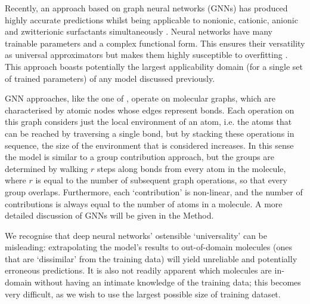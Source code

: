 Recently, an approach based on graph neural networks (GNNs) has produced highly
accurate predictions whilst being applicable to nonionic, cationic, anionic and
zwitterionic surfactants simultaneously \cite{qinPredictingCriticalMicelle2021}.
Neural networks have many trainable parameters and a complex functional form.
This ensures their versatility as universal approximators but makes them highly
susceptible to overfitting \cite{bejaniSystematicReviewOverfitting2021}. This
approach boasts potentially the largest applicability domain (for a single set
of trained parameters) of any model discussed previously.

GNN approaches, like the one of \citet{qinPredictingCriticalMicelle2021},
operate on molecular graphs, which are characterised by atomic nodes whose edges
represent bonds. Each operation on this graph considers just the local
environment of an atom, i.e. the atoms that can be reached by traversing a
single bond, but by stacking these operations in sequence, the size of the
environment that is considered increases. In this sense the model is similar to
a group contribution approach, but the groups are determined by walking $r$
steps along bonds from every atom in the molecule, where $r$ is equal to the
number of subsequent graph operations, so that every group overlaps.
Furthermore, each `contribution' is non-linear, and the number of contributions
is always equal to the number of atoms in a molecule. A more detailed discussion
of GNNs will be given in the Method.

We recognise that deep neural networks' ostensible `universality' can be
misleading: extrapolating the model's results to out-of-domain molecules (ones
that are `dissimilar' from the training data) will yield unreliable and
potentially erroneous predictions. It is also not readily apparent which
molecules are in-domain without having an intimate knowledge of the training
data; this becomes very difficult, as we wish to use the largest possible size
of training dataset.
